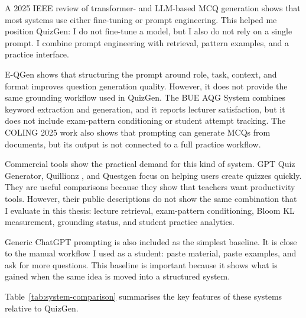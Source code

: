 \documentclass[12pt,a4paper]{article}
\begin{document}
A 2025 IEEE review of transformer- and LLM-based MCQ generation
\cite{ieee2025mcqsurvey} shows that most systems use either fine-tuning or
prompt engineering. This helped me position QuizGen: I do not fine-tune a
model, but I also do not rely on a single prompt. I combine prompt
engineering with retrieval, pattern examples, and a practice interface.

E-QGen \cite{eqgen2024} shows that structuring the prompt around role,
task, context, and format improves question generation quality. However, it does not provide
the same grounding workflow used in QuizGen. The BUE AQG System
\cite{bueaqg2024} combines keyword extraction and generation, and it reports
lecturer satisfaction, but it does not include exam-pattern conditioning or
student attempt tracking. The COLING 2025 work \cite{coling2025mcq} also
shows that prompting can generate MCQs from documents, but its output is not
connected to a full practice workflow.

Commercial tools show the practical demand for this kind of system. GPT Quiz
Generator, Quillionz \cite{quillionz2026}, and Questgen
\cite{questgen2026} focus on helping users create quizzes quickly. They are
useful comparisons because they show that teachers want productivity tools.
However, their public descriptions do not show the same combination that I
evaluate in this thesis: lecture retrieval, exam-pattern conditioning, Bloom
KL measurement, grounding status, and student practice analytics.

Generic ChatGPT prompting is also included as the simplest baseline. It is
close to the manual workflow I used as a student: paste material, paste
examples, and ask for more questions. This baseline is important because it
shows what is gained when the same idea is moved into a structured system.

Table~\ref{tab:system-comparison} summarises the key features of these
systems relative to QuizGen.
\end{document}
